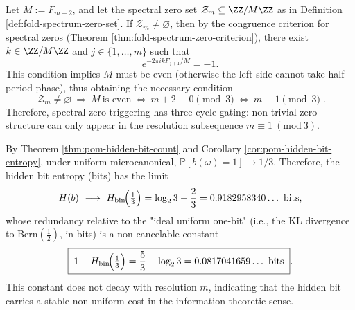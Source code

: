 \begin{conclusion}[Three-Cycle Selection Law for Spectral Zeros: \texorpdfstring{$\mathcal Z_m\neq\varnothing$}{Z_m nonempty} Necessarily Forces \texorpdfstring{$m\equiv 1\ (\mathrm{mod}\ 3)$}{m=1 mod 3}]\label{con:pom-fold-spectrum-zero-selection}
Let \(M:=F_{m+2}\), and let the spectral zero set \(\mathcal Z_m\subseteq \ZZ/M\ZZ\) as in Definition \ref{def:fold-spectrum-zero-set}.
If \(\mathcal Z_m\neq\varnothing\), then by the congruence criterion for spectral zeros (Theorem \ref{thm:fold-spectrum-zero-criterion}), there exist \(k\in\ZZ/M\ZZ\) and \(j\in\{1,\dots,m\}\) such that
\[
e^{-2\pi i kF_{j+1}/M}=-1.
\]
This condition implies \(M\) must be even (otherwise the left side cannot take half-period phase), thus obtaining the necessary condition
\[
\boxed{\;
\mathcal Z_m\neq\varnothing\ \Longrightarrow\ M\ \text{is even}\ \Longleftrightarrow\ m+2\equiv 0\pmod 3\ \Longleftrightarrow\ m\equiv 1\pmod 3\; }.
\]
Therefore, spectral zero triggering has three-cycle gating: non-trivial zero structure can only appear in the resolution subsequence \(m\equiv 1\ (\mathrm{mod}\ 3)\).
\end{conclusion}

\begin{conclusion}\label{con:pom-hidden-bit-redundancy-constant}
By Theorem \ref{thm:pom-hidden-bit-count} and Corollary \ref{cor:pom-hidden-bit-entropy}, under uniform microcanonical, \(\mathbb P[b(\omega)=1]\to 1/3\).
Therefore, the hidden bit entropy (bits) has the limit
\[
H(b)\ \longrightarrow\ H_{\mathrm{bin}}\!\Bigl(\tfrac13\Bigr)
=\log_2 3-\frac{2}{3}
=0.9182958340\ldots\ \mathrm{bits},
\]
whose redundancy relative to the "ideal uniform one-bit" (i.e., the KL divergence to \(\mathrm{Bern}(\tfrac12)\), in bits) is a non-cancelable constant
\[
\boxed{\;
1-H_{\mathrm{bin}}\!\Bigl(\tfrac13\Bigr)
=\frac53-\log_2 3
=0.0817041659\ldots\ \mathrm{bits}\; }.
\]
This constant does not decay with resolution \(m\), indicating that the hidden bit carries a stable non-uniform cost in the information-theoretic sense.
\end{conclusion}

